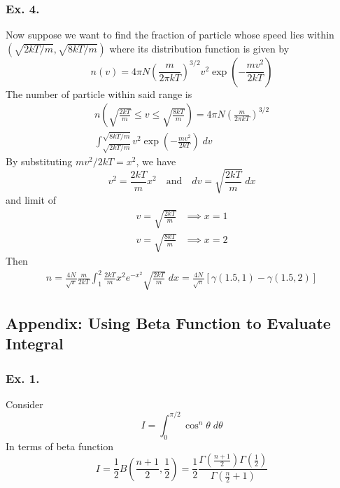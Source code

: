 \documentclass[../../main.tex]{subfiles}
\begin{document}
\subsubsection{Ex. 4.} Now suppose we want to find the fraction of particle whose speed lies within $(\sqrt{2kT/m}, \sqrt{8kT/m})$ where its distribution function is given by 
\begin{equation*}
    n(v)=4\pi N\left(\frac{m}{2\pi kT}\right)^{3/2}v^2\exp\left(-\frac{mv^2}{2kT}\right)
\end{equation*}
The number of particle within said range is 
\begin{multline*}
    n\left(\sqrt{\frac{2kT}{m}}\leq v\leq \sqrt{\frac{8kT}{m}}\right)=4\pi N\left(\frac{m}{2\pi kT}\right)^{3/2}\\
    \int_{\sqrt{2kT/m}}^{\sqrt{8kT/m}}v^2\exp\left(-\frac{mv^2}{2kT}\right)\;dv
\end{multline*}
By substituting $mv^2/2kT=x^2$, we have 
\begin{equation*}
    v^2=\frac{2kT}{m}x^2\quad\text{and}\quad dv=\sqrt{\frac{2kT}{m}}\;dx
\end{equation*}
and limit of 
\begin{align*}
    v=\sqrt{\frac{2kT}{m}}&\implies x=1\\
    v=\sqrt{\frac{8kT}{m}}&\implies x=2
\end{align*}
Then 
\begin{align*}
    n=\frac{4N}{\sqrt{\pi}}\frac{m}{2kT}\int_{1}^{2}\frac{2kT}{m}x^2 e^{-x^2} \sqrt{\frac{ 2kT}{m }}\;dx=\frac{4N}{\sqrt{\pi}}\left[\gamma(1.5,1)-\gamma(1.5,2)\right]
\end{align*}

\subsection{Appendix: Using Beta Function to Evaluate Integral}
\subsubsection{Ex. 1.} Consider
\begin{equation*}
    I=\int_{0}^{\pi/2}\cos^n\theta\;d\theta
\end{equation*}
In terms of beta function
\begin{equation*}
    I=\frac{1}{2}B\left(\frac{n+1}{2},\frac{1}{2}\right)=\frac{1}{2}\frac{\Gamma\left(\frac{n+1}{2}\right)\Gamma\left(\frac{1}{2}\right)}{\Gamma\left(\frac{n}{2}+1\right)}
\end{equation*}
\end{document}
